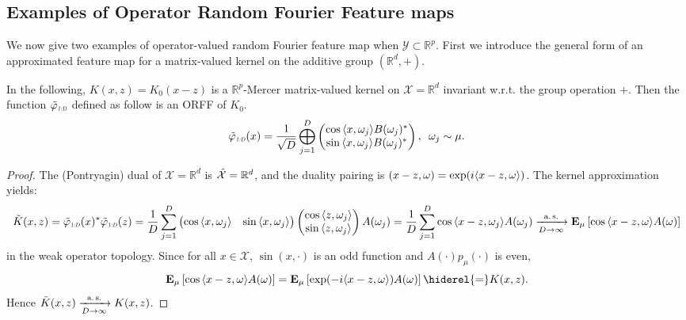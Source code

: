 \subsection{Examples of Operator Random Fourier Feature maps}
We now give two examples of operator-valued random Fourier feature map when $\mathcal{Y}\subset\mathbb{R}^p$. First we introduce the general form of an approximated feature map for a matrix-valued kernel on the additive group $(\mathbb{R}^d,+)$.
\begin{example}\label{ex:additive_group}
In the following, $K(x,z)=K_0(x-z)$ is a $\mathbb{R}^p$-Mercer matrix-valued kernel on $\mathcal{X}=\mathbb{R}^d$ invariant w.r.t. the group operation $+$. %
Then the function $\tildePhi{1:D}$ defined as follow is an \acl{ORFF} of $K_{0}$.
\begin{equation*}
\begin{aligned}
\tildePhi{1:D}(x)=\frac{1}{\sqrt{D}}\Vect_{j=1}^D\begin{pmatrix}\cos{\inner{x,\omega_j}}B(\omega_j)^* \\ \sin{\inner{x,\omega_j}}B(\omega_j)^*\end{pmatrix}, \enskip \omega_j \sim \mu.
\end{aligned}
\end{equation*}
\end{example}
\begin{proof}
The (Pontryagin) dual of $\mathcal{X}=\mathbb{R}^d$
is $\hat{\mathcal{X}}=\mathbb{R}^d$, and the duality pairing is $(x-z,\omega)=\exp(i\langle x-z, \omega\rangle)$. The kernel approximation yields:
\begin{dmath*}
\tilde{K}(x,z)=\tildePhi{1:D}(x)^*\tildePhi{1:D}(z)
= \frac{1}{D} \sum_{j=1}^D \begin{pmatrix} \cos{\inner{x,\omega_j}} & \sin{\inner{x,\omega_j}} \end{pmatrix}\begin{pmatrix}\cos{\inner{z,\omega_j}} \\ \sin{\inner{z,\omega_j}} \end{pmatrix} A(\omega_j)
= \frac{1}{D} \sum_{j=1}^D \cos{\inner{x-z,\omega_j}}A(\omega_j) \\
\converges{\asurely}{D\to\infty}\expectation_\mu\left[\cos{\inner{x-z,\omega}}A(\omega)\right]
\end{dmath*}
in the weak operator topology. Since for all $x\in\mathcal{X}$, $\sin(x, \cdot)$ is an odd function and $A(\cdot)p_\mu(\cdot)$ is even,
\begin{dmath*}
\expectation_\mu\left[\cos{\inner{x-z,\omega}}A(\omega)\right]=\expectation_\mu\left[\exp(-i\inner{x-z,\omega})A(\omega)\right]\hiderel{=}K(x,z).
\end{dmath*}
Hence $\tilde{K}(x,z)\xrightarrow[D\to\infty]{\text{a.\,s.}}K(x,z)$.
\end{proof}
